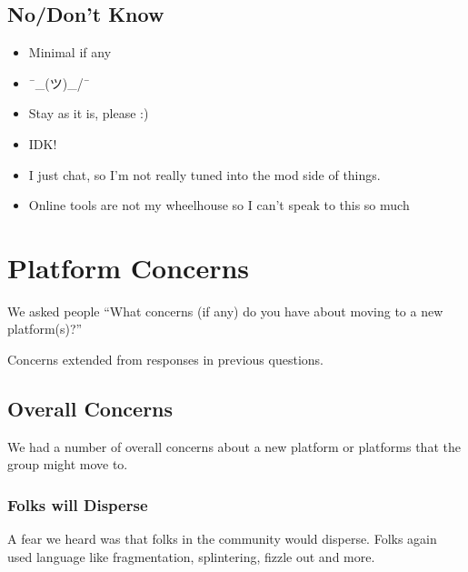 \documentclass[
]{book}
\providecommand{\tightlist}{%
  \setlength{\itemsep}{0pt}\setlength{\parskip}{0pt}}
\begin{document}
\section{No/Don't Know}\label{nodont-know}

\begin{itemize}
\tightlist
\item
  Minimal if any
\item
  ¯\_(ツ)\_/¯
\item
  Stay as it is, please :)
\item
  IDK!
\item
  I just chat, so I'm not really tuned into the mod side of things.
\item
  Online tools are not my wheelhouse so I can't speak to this so much
\end{itemize}

\chapter{Platform Concerns}\label{platform-concerns}

We asked people ``What concerns (if any) do you have about moving to a new platform(s)?''

Concerns extended from responses in previous questions.

\section{Overall Concerns}\label{overall-concerns}

We had a number of overall concerns about a new platform or platforms that the group might move to.

\subsection{Folks will Disperse}\label{folks-will-disperse}

A fear we heard was that folks in the community would disperse. Folks again used language like fragmentation, splintering, fizzle out and more.
\end{document}
